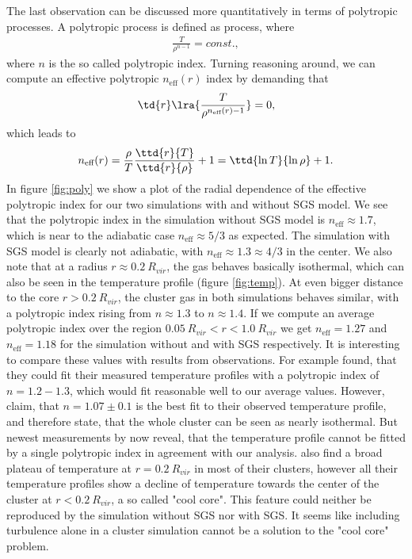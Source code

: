 The last observation can be discussed more quantitatively in terms of
polytropic processes. A polytropic process is defined as process, where
\begin{align}
\frac{T}{\rho^{n-1}} = const.,
\end{align}
where $n$ is the so called polytropic index. Turning reasoning around, we can
compute an effective polytropic $n_{\text{eff}}(r)$ index by demanding that
\begin{align}
\td{r}\lra{\frac{T}{\rho^{n_{\text{eff}}(r)-1}}}=0,
\end{align}
which leads to
\begin{align}
n_{\text{eff}}(r)=\frac{\rho}{T}\frac{\ttd{r}{T}}{\ttd{r}{\rho}}+1
=\ttd{\ln T}{\ln \rho}+1. 
\end{align}
In figure \ref{fig:poly}
we show a plot of the radial dependence of the effective
polytropic index for our two simulations with and without SGS model. 
We see that the polytropic index in the simulation without SGS
model is $n_{\text{eff}} \approx 1.7$, which is near to the adiabatic case
$n_{\text{eff}} \approx 5/3$ as expected. The simulation with SGS model is
clearly not
adiabatic, with $n_{\text{eff}} \approx 1.3 \approx 4/3$ in the center. We
also note that at a radius $r \approx 0.2\ R_{vir}$, the gas behaves
basically
isothermal, which can also be seen in the temperature profile
(figure \ref{fig:temp}). At even bigger distance to the core 
$r > 0.2\ R_{vir}$, the cluster gas in both simulations behaves similar,
with a
polytropic index rising from $n \approx 1.3$ to $n \approx 1.4$. 
If we compute an average polytropic index over the region 
$0.05\ R_{vir} < r < 1.0\ R_{vir}$ we get $n_{\text{eff}} = 1.27$
and $n_{\text{eff}} = 1.18$
for the simulation without and with SGS respectively. It is
interesting to compare these values with results from observations. For example 
\citet{Markevitch1998} found, that they could fit their measured temperature
profiles with a polytropic index of $n=1.2-1.3$, which would fit reasonable
well to our average values. However, \citet{Pratt2002} claim, that 
$n=1.07 \pm 0.1$ is the best fit to their observed temperature profile, and
therefore state, that the whole cluster can be seen as nearly isothermal.
But newest measurements by \citet{Vikhlinin2006} now reveal, that the
temperature profile cannot be fitted by a single polytropic index in agreement
with our analysis. \citet{Vikhlinin2006} also find a broad plateau of
temperature at $r=0.2\ R_{vir}$ in most of their clusters, however all
their
temperature profiles show a decline of temperature towards the center of the
cluster at $r < 0.2\ R_{vir}$, a so called "cool core". This feature
could
neither be reproduced by the simulation without SGS nor with SGS. It seems like
including turbulence alone in a cluster simulation cannot be a solution to the
"cool core" problem. 

